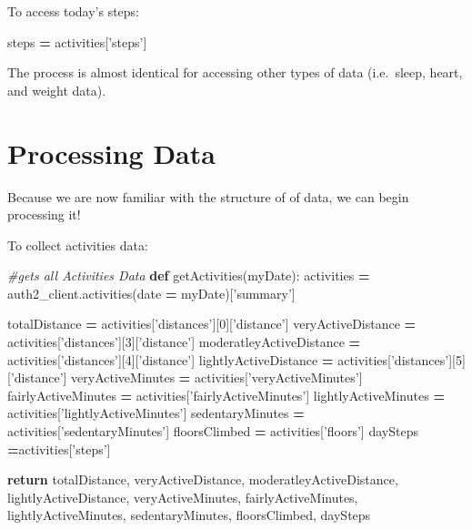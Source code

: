 \documentclass[]{book}
\newenvironment{Shaded}{\begin{snugshade}}{\end{snugshade}}
\newcommand{\KeywordTok}[1]{\textcolor[rgb]{0.13,0.29,0.53}{\textbf{#1}}}
\newcommand{\DecValTok}[1]{\textcolor[rgb]{0.00,0.00,0.81}{#1}}
\newcommand{\StringTok}[1]{\textcolor[rgb]{0.31,0.60,0.02}{#1}}
\newcommand{\CommentTok}[1]{\textcolor[rgb]{0.56,0.35,0.01}{\textit{#1}}}
\newcommand{\ControlFlowTok}[1]{\textcolor[rgb]{0.13,0.29,0.53}{\textbf{#1}}}
\newcommand{\OperatorTok}[1]{\textcolor[rgb]{0.81,0.36,0.00}{\textbf{#1}}}
\newcommand{\NormalTok}[1]{#1}
\begin{document}
To access today's steps:

\begin{Shaded}
\begin{Highlighting}[]
\NormalTok{steps }\OperatorTok{=}\NormalTok{ activities[}\StringTok{'steps'}\NormalTok{]}
\end{Highlighting}
\end{Shaded}

The process is almost identical for accessing other types of data
(i.e.~sleep, heart, and weight data).

\section{Processing Data}\label{processing-data}

Because we are now familiar with the structure of of data, we can begin
processing it!

To collect activities data:

\begin{Shaded}
\begin{Highlighting}[]
\CommentTok{#gets all Activities Data}
\KeywordTok{def}\NormalTok{ getActivities(myDate): }
\NormalTok{    activities }\OperatorTok{=}\NormalTok{ auth2_client.activities(date }\OperatorTok{=}\NormalTok{ myDate)[}\StringTok{'summary'}\NormalTok{]}

\NormalTok{    totalDistance }\OperatorTok{=}\NormalTok{ activities[}\StringTok{'distances'}\NormalTok{][}\DecValTok{0}\NormalTok{][}\StringTok{'distance'}\NormalTok{]}
\NormalTok{    veryActiveDistance }\OperatorTok{=}\NormalTok{ activities[}\StringTok{'distances'}\NormalTok{][}\DecValTok{3}\NormalTok{][}\StringTok{'distance'}\NormalTok{]}
\NormalTok{    moderatleyActiveDistance }\OperatorTok{=}\NormalTok{ activities[}\StringTok{'distances'}\NormalTok{][}\DecValTok{4}\NormalTok{][}\StringTok{'distance'}\NormalTok{]}
\NormalTok{    lightlyActiveDistance }\OperatorTok{=}\NormalTok{ activities[}\StringTok{'distances'}\NormalTok{][}\DecValTok{5}\NormalTok{][}\StringTok{'distance'}\NormalTok{]}
\NormalTok{    veryActiveMinutes }\OperatorTok{=}\NormalTok{ activities[}\StringTok{'veryActiveMinutes'}\NormalTok{]}
\NormalTok{    fairlyActiveMinutes }\OperatorTok{=}\NormalTok{ activities[}\StringTok{'fairlyActiveMinutes'}\NormalTok{]}
\NormalTok{    lightlyActiveMinutes }\OperatorTok{=}\NormalTok{ activities[}\StringTok{'lightlyActiveMinutes'}\NormalTok{]}
\NormalTok{    sedentaryMinutes }\OperatorTok{=}\NormalTok{ activities[}\StringTok{'sedentaryMinutes'}\NormalTok{]}
\NormalTok{    floorsClimbed }\OperatorTok{=}\NormalTok{ activities[}\StringTok{'floors'}\NormalTok{]}
\NormalTok{    daySteps }\OperatorTok{=}\NormalTok{activities[}\StringTok{'steps'}\NormalTok{]}
    
    \ControlFlowTok{return}\NormalTok{ totalDistance, veryActiveDistance, moderatleyActiveDistance, lightlyActiveDistance,   veryActiveMinutes, fairlyActiveMinutes, lightlyActiveMinutes, sedentaryMinutes, floorsClimbed, daySteps}
\end{Highlighting}
\end{Shaded}
\end{document}
